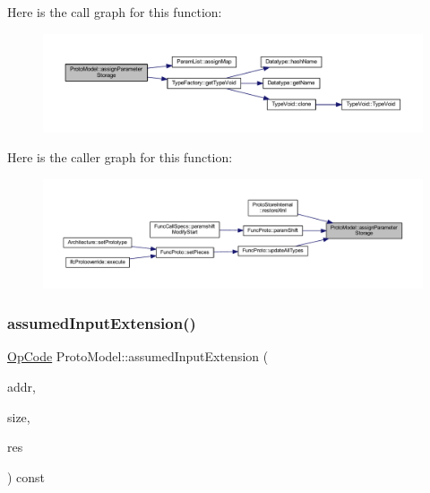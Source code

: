 Here is the call graph for this function\+:
\nopagebreak
\begin{figure}[H]
\begin{center}
\leavevmode
\includegraphics[width=350pt]{class_proto_model_a5c32e533f079fc91875ccd486f70f36e_cgraph}
\end{center}
\end{figure}
Here is the caller graph for this function\+:
\nopagebreak
\begin{figure}[H]
\begin{center}
\leavevmode
\includegraphics[width=350pt]{class_proto_model_a5c32e533f079fc91875ccd486f70f36e_icgraph}
\end{center}
\end{figure}
\mbox{\label{class_proto_model_a4fcf1b51c0ce470e353e798b9eaa8603}} 
\subsubsection{\texorpdfstring{assumedInputExtension()}{assumedInputExtension()}}
{\footnotesize\ttfamily \mbox{\hyperlink{opcodes_8hh_abeb7dfb0e9e2b3114e240a405d046ea7}{Op\+Code}} Proto\+Model\+::assumed\+Input\+Extension (\begin{DoxyParamCaption}\item[{const \mbox{\hyperlink{class_address}{Address}} \&}]{addr,  }\item[{int4}]{size,  }\item[{\mbox{\hyperlink{struct_varnode_data}{Varnode\+Data}} \&}]{res }\end{DoxyParamCaption}) const\hspace{0.3cm}{\ttfamily [inline]}}



